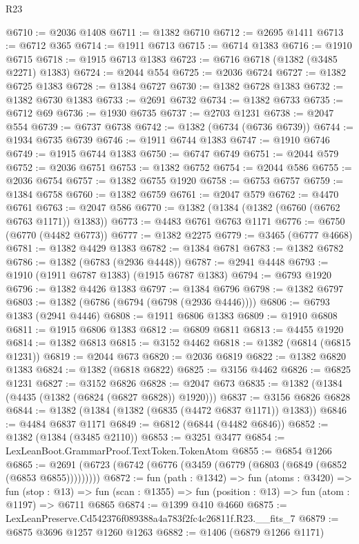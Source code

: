 \begin{lexlean}{R23}
\begin{coremodule}
@6710 := @2036 @1408
@6711 := @1382 @6710
@6712 := @2695 @1411
@6713 := @6712 @365
@6714 := @1911 @6713
@6715 := @6714 @1383
@6716 := @1910 @6715
@6718 := @1915 @6713 @1383
@6723 := @6716 @6718 (@1382 (@3485 @2271) @1383)
@6724 := @2044 @554
@6725 := @2036 @6724
@6727 := @1382 @6725 @1383
@6728 := @1384 @6727
@6730 := @1382 @6728 @1383
@6732 := @1382 @6730 @1383
@6733 := @2691 @6732
@6734 := @1382 @6733
@6735 := @6712 @69
@6736 := @1930 @6735
@6737 := @2703 @1231
@6738 := @2047 @554
@6739 := @6737 @6738
@6742 := @1382 (@6734 (@6736 @6739))
@6744 := @1934 @6735 @6739
@6746 := @1911 @6744 @1383
@6747 := @1910 @6746
@6749 := @1915 @6744 @1383
@6750 := @6747 @6749
@6751 := @2044 @579
@6752 := @2036 @6751
@6753 := @1382 @6752
@6754 := @2044 @586
@6755 := @2036 @6754
@6757 := @1382 @6755 @1920
@6758 := @6753 @6757
@6759 := @1384 @6758
@6760 := @1382 @6759
@6761 := @2047 @579
@6762 := @4470 @6761
@6763 := @2047 @586
@6770 := @1382 (@1384 (@1382 (@6760 (@6762 @6763 @1171)) @1383))
@6773 := @4483 @6761 @6763 @1171
@6776 := @6750 (@6770 (@4482 @6773))
@6777 := @1382 @2275
@6779 := @3465 (@6777 @4668)
@6781 := @1382 @4429 @1383
@6782 := @1384 @6781
@6783 := @1382 @6782
@6786 := @1382 (@6783 (@2936 @4448))
@6787 := @2941 @4448
@6793 := @1910 (@1911 @6787 @1383) (@1915 @6787 @1383)
@6794 := @6793 @1920
@6796 := @1382 @4426 @1383
@6797 := @1384 @6796
@6798 := @1382 @6797
@6803 := @1382 (@6786 (@6794 (@6798 (@2936 @4446))))
@6806 := @6793 @1383 (@2941 @4446)
@6808 := @1911 @6806 @1383
@6809 := @1910 @6808
@6811 := @1915 @6806 @1383
@6812 := @6809 @6811
@6813 := @4455 @1920
@6814 := @1382 @6813
@6815 := @3152 @4462
@6818 := @1382 (@6814 (@6815 @1231))
@6819 := @2044 @673
@6820 := @2036 @6819
@6822 := @1382 @6820 @1383
@6824 := @1382 (@6818 @6822)
@6825 := @3156 @4462
@6826 := @6825 @1231
@6827 := @3152 @6826
@6828 := @2047 @673
@6835 := @1382 (@1384 (@4435 (@1382 (@6824 (@6827 @6828)) @1920)))
@6837 := @3156 @6826 @6828
@6844 := @1382 (@1384 (@1382 (@6835 (@4472 @6837 @1171)) @1383))
@6846 := @4484 @6837 @1171
@6849 := @6812 (@6844 (@4482 @6846))
@6852 := @1382 (@1384 (@3485 @2110))
@6853 := @3251 @3477
@6854 := LexLeanBoot.GrammarProof.TextToken.TokenAtom
@6855 := @6854 @1266
@6865 := @2691 (@6723 (@6742 (@6776 (@3459 (@6779 (@6803 (@6849 (@6852 (@6853 @6855)))))))))
@6872 := fun (path : @1342) =>
  fun (atoms : @3420) =>
  fun (stop : @13) =>
  fun (scan : @1355) => fun (position : @13) => fun (atom : @1197) => @6711 @6865
@6874 := @1399 @410 @4660
@6875 := LexLeanPreserve.Cd542376f089388a4a783f2fc4c26811f.R23.__fits_7
@6879 := @6875 @3696 @1257 @1260 @1263
@6882 := @1406 (@6879 @1266 @1171)

\end{coremodule}
\end{lexlean}
